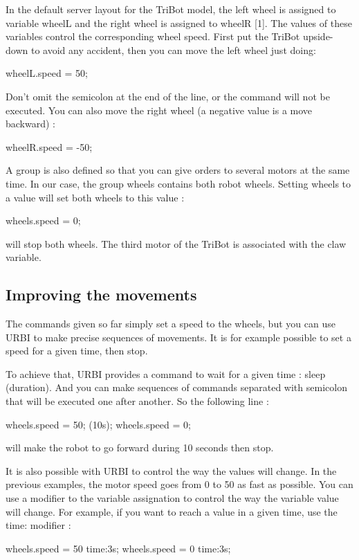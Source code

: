 In the default server layout for the TriBot model, the left wheel is assigned
to variable wheelL and the right wheel is assigned to wheelR [1]. The values of
these variables control the corresponding wheel speed. First put the TriBot
upside-down to avoid any accident, then you can move the left wheel just doing:
\begin{urbiunchecked}
  wheelL.speed = 50;
\end{urbiunchecked}

Don't omit the semicolon at the end of the line, or the command will not be
executed. You can also move the right wheel (a negative value is a move
backward) :
\begin{urbiunchecked}
  wheelR.speed = -50;
\end{urbiunchecked}

A group is also defined so that you can give orders to several motors at the
same time. In our case, the group wheels contains both robot wheels. Setting
wheels to a value will set both wheels to this value :
\begin{urbiunchecked}
  wheels.speed = 0;
\end{urbiunchecked}

will stop both wheels.
The third motor of the TriBot is associated with the claw variable.

\subsection{Improving the movements}
The commands given so far simply set a speed to the wheels, but you can use
URBI to make precise sequences of movements. It is for example possible to set
a speed for a given time, then stop.

To achieve that, URBI provides a command to wait for a given time : sleep
(duration). And you can make sequences of commands separated with semicolon
that will be executed one after another. So the following line :
\begin{urbiunchecked}
  wheels.speed = 50; (10s); wheels.speed = 0;
\end{urbiunchecked}

will make the robot to go forward during 10 seconds then stop.

It is also possible with URBI to control the way the values will change. In the
previous examples, the motor speed goes from 0 to 50 as fast as possible. You
can use a modifier to the variable assignation to control the way the variable
value will change. For example, if you want to reach a value in a given time,
use the time: modifier :
\begin{urbiunchecked}
  wheels.speed = 50 time:3s; wheels.speed = 0 time:3s;
\end{urbiunchecked}

